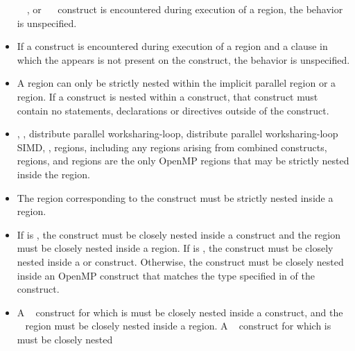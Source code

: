 \begin{itemize}
      ~~, or
      ~~ construct is encountered during
      execution of a  region, the behavior is unspecified.
\item If a  construct is encountered during execution of a
       region and a  clause in which the 
        appears is not present on 
      the construct, the behavior is unspecified.
\item A  region can only be strictly nested within the implicit 
      parallel region or a  region. If a  construct 
      is nested within a  construct, that  construct 
      must contain no statements, declarations or directives outside of the 
       construct.
\item {}, , distribute parallel 
      worksharing-loop, distribute parallel worksharing-loop SIMD, , 
       regions, including any  regions arising 
      from combined constructs,  regions, and 
       regions are the only OpenMP regions
      that may be strictly nested inside the  region.
\item The region corresponding to the  construct must be
      strictly nested inside a  region.
\item If  is , the 
      construct must be closely nested inside a  construct and the
       region must be closely nested inside a  
      region. If  is , the 
       construct must be closely nested inside a  
      or  construct. Otherwise, the  construct must 
      be closely nested inside an OpenMP construct that matches the type 
      specified in  of the  construct.
\item A ~ construct for which
       is  must be closely nested
      inside a  construct, and the ~
      region must be closely nested inside a  region. A
      ~ construct for which
       is  must be closely nested

\end{itemize}
